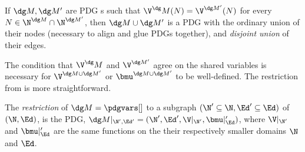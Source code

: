 {    \begin{defn}[union] \label{def:model-union}
    	If $\dg M, \dg M'$ are PDG s such that $\V^\dg M(N) = \V^{\dg M'}(N)$ for every $N \in  \N^{\dg M} \cap \N^{\dg M'}$, then $\dg M \cup \dg M'$ is a PDG with the ordinary union of their nodes (necessary to align and glue PDGs together), and \emph{disjoint union} of their edges. 
    \end{defn}
    The condition that $\V^\dg M$ and $\V^{\dg M'}$ agree on the shared variables is necessary for $\V^{\dg M\cup \dg M'}$ or $\bmu^{\dg M \cup \dg M'}$ to be well-defined.%
    The restriction from  is more straightforward.%

    \begin{defn}[restriction]\label{def:restriction}
    	The \emph{restriction} of $\dg M = \pdgvars[]$ to a subgraph $(\N' \subseteq \N, \Ed' \subseteq \Ed)$ of $(\N, \Ed)$, is the PDG, $\dg M|_{\N', \Ed'} = (\N', \Ed', \V |_{\N'}, \bmu|_\Ed')$, where 
    	$\V|_{\N'}$ and $\bmu|_\Ed'$ are the same functions on the their respectively smaller domains $\N$ and $\Ed$. 
    \end{defn}



}
